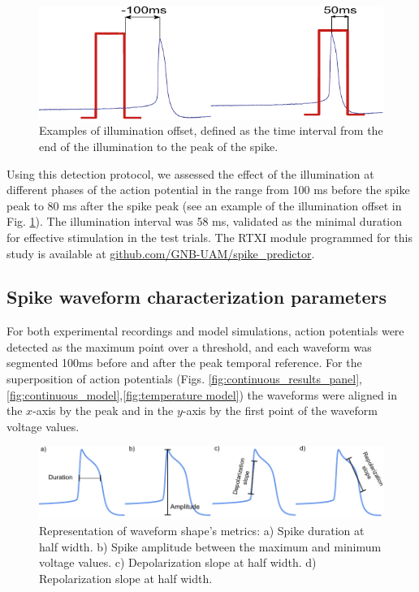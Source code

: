 \begin{figure}[htb!]
	\includegraphics[width=\textwidth]{img/laser/offset_examples.pdf}
	\caption{Examples of illumination offset, defined as the time interval from the end of the illumination to the peak of the spike.}
	\label{fig:offset_example}
\end{figure}

Using this detection protocol, we assessed the effect of the illumination at different phases of the action potential in the range from 100 ms before the spike peak to 80 ms after the spike peak (see an example of the illumination offset in Fig. \ref{fig:offset_example}). The illumination interval was 58 ms, validated as the minimal duration for effective stimulation in the test trials. The RTXI module programmed for this study is available at \href{https://github.com/GNB-UAM/spike_predictor}{github.com/GNB-UAM/spike\_predictor}.

\subsection{Spike waveform characterization parameters} \label{sec:characterization parameters}
\label{sect:metrics}
For both experimental recordings and model simulations, action potentials were detected as the maximum point over a threshold, and each waveform was segmented 100ms before and after the peak temporal reference. For the superposition of action potentials (Figs. \ref{fig:continuous_results_panel},\ref{fig:continuous_model},\ref{fig:temperature model}) the waveforms were aligned in the $x$-axis by the peak and in the $y$-axis by the first point of the waveform voltage values.

\begin{figure}[htb!]
	\includegraphics[width=\textwidth]{img/laser/spike_metrics.pdf}
	\caption{Representation of waveform shape's metrics: a) Spike duration at half width. b) Spike amplitude between the maximum and minimum voltage values. c) Depolarization slope at half width. d) Repolarization slope at half width.}
	\label{fig:spike metrics}
\end{figure}


